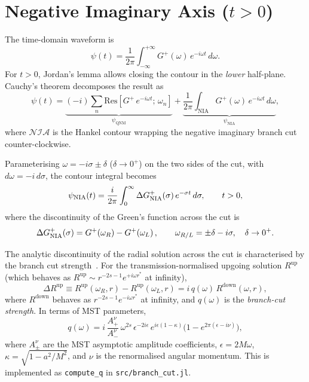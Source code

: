 \documentclass[12pt,a4paper]{article}
\newcommand{\psiQNM}{\psi_{\mathrm{QNM}}}
\begin{document}
\section{Negative Imaginary Axis (\texorpdfstring{$t>0$}{t>0})}

The time-domain waveform is
\begin{equation}
  \psi(t) = \frac{1}{2\pi}\int_{-\infty}^{+\infty} G^+(\omega)\,e^{-i\omega t}\,d\omega.
  \label{eq:fourier}
\end{equation}
For $t>0$, Jordan's lemma allows closing the contour in the \emph{lower}
half-plane.
Cauchy's theorem decomposes the result as
\begin{equation}
  \psi(t) = \underbrace{(-i)\sum_n \mathrm{Res}[G^+\,e^{-i\omega t};\,\omega_n]}_{\psiQNM}
  + \underbrace{\frac{1}{2\pi}\int_{\mathrm{NIA}}G^+(\omega)\,e^{-i\omega t}\,d\omega}_{\psi_{\mathrm{NIA}}},
  \label{eq:cauchy}
\end{equation}
where $\mathcal{NIA}$ is the Hankel contour wrapping the negative imaginary
branch cut counter-clockwise.

Parameterising $\omega = -i\sigma \pm \delta$ ($\delta\to 0^+$) on the two
sides of the cut, with $d\omega = -i\,d\sigma$, the contour integral becomes
\begin{equation}
    \psi_{\mathrm{NIA}}(t) = \frac{i}{2\pi}
    \int_0^{\infty} \Delta G^+_{\rm NIA}(\sigma)\,e^{-\sigma t}\,d\sigma,
    \qquad t > 0,
  \label{eq:BC_neg}
\end{equation}
where the discontinuity of the Green's function across the cut is
\begin{equation}
  \Delta G^+_{\rm NIA}(\sigma)
  = G^+\!\left(\omega_R\right) - G^+\!\left(\omega_L\right),
  \qquad \omega_{R/L} = \pm\delta - i\sigma,\quad \delta\to 0^+.
  \label{eq:DG_neg}
\end{equation}

The analytic discontinuity of the radial solution across the cut is
characterised by the branch cut strength~\cite{Casals2016}.
For the transmission-normalised upgoing solution
$R^{\mathrm{up}}$
(which behaves as $R^{\mathrm{up}} \sim r^{-2s-1}e^{+i\omega r^*}$ at infinity),
\begin{equation}
  \Delta R^{\mathrm{up}}
  \equiv R^{\mathrm{up}}(\omega_R,r) - R^{\mathrm{up}}(\omega_L,r)
  = i\,q(\omega)\,R^{\mathrm{down}}(\omega,r),
  \label{eq:deltaRup}
\end{equation}
where $R^{\mathrm{down}}$ behaves as $r^{-2s-1}e^{-i\omega r^*}$ at infinity,
and $q(\omega)$ is the \emph{branch-cut strength}.
In terms of MST parameters,
\begin{equation}
  q(\omega) = i\,\frac{A^\nu_+}{A^\nu_-}\,\omega^{2s}\,\epsilon^{-2i\epsilon}\,
              e^{i\epsilon(1-\kappa)}\bigl(1-e^{2\pi(\epsilon-i\nu)}\bigr),
  \label{eq:q}
\end{equation}
where $A^\nu_\pm$ are the MST asymptotic amplitude coefficients,
$\epsilon = 2M\omega$, $\kappa = \sqrt{1-a^2/M^2}$, and $\nu$ is the
renormalised angular momentum.
This is implemented as \texttt{compute\_q} in \texttt{src/branch\_cut.jl}.
\end{document}
